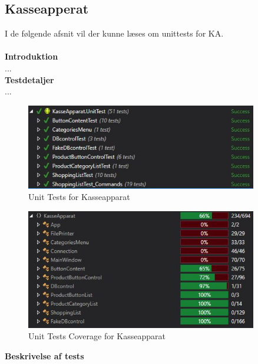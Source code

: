 \subsection{Kasseapperat}
I de følgende afsnit vil der kunne læses om unittests for \gls{KA}.\\\\

\textbf{Introduktion}\\
...\\

\textbf{Testdetaljer}\\
...

\begin{figure}[H]
	\centering
	\includegraphics[width=0.90\textwidth]{Test/Images/Frontend/UnitTests}
	\caption{Unit Tests for Kasseapparat}
	\label{fig:UTKA}
\end{figure}

\begin{figure}[H]
	\centering
	\includegraphics[width=0.90\textwidth]{Test/Images/Frontend/UnitTestCover}
	\caption{Unit Tests Coverage for Kasseapparat}
	\label{fig:UTCKA}
\end{figure}

\textbf{Beskrivelse af tests}\\
